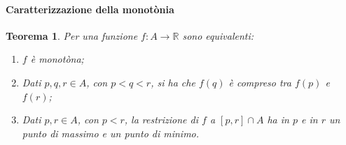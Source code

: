 \documentclass{article}
\theoremstyle{plain}
\newtheorem{thm}{Teorema}[section]
\theoremstyle{definition}
\theoremstyle{remark}
\begin{document}
\paragraph{Caratterizzazione della monotònia}
\begin{bxthm}
\begin{thm}
    Per una funzione $f:A\to\mathbb{R}$ sono equivalenti:
    \begin{enumerate}
        \item $f$ è monotòna;
        \item Dati $p,q,r\in A$, con $p<q<r$, si ha che $f(q)$ è compreso tra $f(p)$ e $f(r)$;
        \item Dati $p,r\in A$, con $p<r$, la restrizione di $f$ a $[p,r]\cap A$ ha in $p$ e in $r$ un punto di massimo e un punto di minimo. 
    \end{enumerate}
\end{thm}
\end{bxthm}
\end{document}
